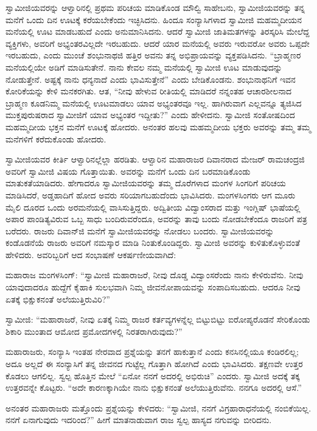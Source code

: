  ಸ್ವಾಮೀಜಿಯವರನ್ನು ಆಳ್ವಾರಿನಲ್ಲಿ ಪ್ರಥಮ ಪರಿಚಯ ಮಾಡಿಕೊಂಡ ಮೌಲ್ವಿ ಸಾಹೇಬನು, ಸ್ವಾಮೀಜಿಯವರನ್ನು ತನ್ನ ಮನೆಗೆ ಒಂದು ದಿನ ಊಟಕ್ಕೆ ಕರೆಯಬೇಕೆಂದು ಇಚ್ಛಿಸಿದನು. ಹಿಂದೂ ಸಂನ್ಯಾಸಿಗಳಾದ ಸ್ವಾಮೀಜಿ ಮಹಮ್ಮದೀಯನ ಮನೆಯಲ್ಲಿ ಊಟ ಮಾಡಬಹುದೆ ಎಂದು ಅನುಮಾನಿಸಿದನು. ಆದರೆ ಸ್ವಾಮೀಜಿ ಜಾತಿಮತಗಳನ್ನು ತಿರಸ್ಕರಿಸಿ ಮೇಲೆದ್ದ ವ್ಯಕ್ತಿಗಳು, ಅವರಿಗೆ ಅಭ್ಯಂತರವಿಲ್ಲದೇ ಇರಬಹುದು. ಆದರೆ ಯಾರ ಮನೆಯಲ್ಲಿ ಅವರು ಇರುವರೋ ಅವರು ಒಪ್ಪದೇ ಇರಬಹುದು, ಎಂದು ಮುಂಚೆ ಶಂಭುನಾಥಜಿ ಹತ್ತಿರ ಅವನು ತನ್ನ ಅಭಿಪ್ರಾಯವನ್ನು ವ್ಯಕ್ತಪಡಿಸಿದನು. “ಬ್ರಾಹ್ಮಣರ ಮನೆಯಲ್ಲಿಯೇ ಅಡಿಗೆ ಮಾಡಿಸುತೇನೆ. ನಾನು ಕೇವಲ ನಮ್ಮ ಮನೆಯಲ್ಲಿ ಸ್ವಾಮೀಜಿ ಊಟ ಮಾಡುವುದನ್ನು ನೋಡುತ್ತೇನೆ. ಅಷ್ಟಕ್ಕೆ ನಾನು ಧನ್ಯನಾದೆ ಎಂದು ಭಾವಿಸುತ್ತೇನೆ” ಎಂದು ಬೇಡಿಕೊಂಡನು. ಶಂಭುನಾಥನಿಗೆ ಇವನ ಕೋರಿಕೆಯನ್ನು ಕೇಳಿ ಮನಕರಗಿತು. ಆತ, “ನೀವು ಹೇಳುವ ರೀತಿಯಲ್ಲಿ ಮಾಡಿದರೆ ನನ್ನಂತಹ ಆಚಾರಶೀಲನಾದ ಬ್ರಾಹ್ಮಣ ಕೂಡನಿಮ್ಮ ಮನೆಯಲ್ಲಿ ಊಟಮಾಡಲು ಯಾವ ಅಭ್ಯಂತರವೂ ಇಲ್ಲ. ಹಾಗಿರುವಾಗ ಎಲ್ಲವನ್ನೂ ತ್ಯಜಿಸಿದ ಮುಕ್ತಪುರುಷರಾದ ಸ್ವಾಮೀಜಿಗೆ ಯಾವ ಅಭ್ಯಂತರ ಇದ್ದೀತು?” ಎಂದು ಹೇಳೀದನು. ಸ್ವಾಮೀಜಿ ಸಂತೋಷದಿಂದ ಮಹಮ್ಮದೀಯ ಭಕ್ತನ ಮನೆಗೆ ಊಟಕ್ಕೆ ಹೋದರು. ಅನಂತರ ಹಲವು ಮಹಮ್ಮದೀಯ ಭಕ್ತರು ಅವರನ್ನು ತಮ್ಮ ತಮ್ಮ ಮನೆಗಳಿಗೆ ಕರೆದುಕೊಂಡು ಹೋದರು. 

 ಸ್ವಾಮೀಜಿಯವರ ಕೀರ್ತಿ ಆಳ್ವಾರಿನಲ್ಲೆಲ್ಲಾ ಹರಡಿತು. ಆಳ್ವಾರಿನ ಮಹಾರಾಜರ ದಿವಾನರಾದ ಮೇಜರ್ ರಾಮಚಂದ್ರಜಿ ಅವರಿಗೆ ಸ್ವಾಮೀಜಿ ವಿಷಯ ಗೊತ್ತಾಯಿತು. ಅವರನ್ನು ಮನೆಗೆ ಒಂದು ದಿನ ಬರಮಾಡಿಕೊಂಡು ಮಾತುಕತೆಯಾಡಿದರು. ಹೇಗಾದರೂ ಸ್ವಾಮೀಜಿಯವರನ್ನು ತಮ್ಮ ದೊರೆಗಳಾದ ಮಂಗಳ ಸಿಂಗರಿಗೆ ಪರಿಚಯ ಮಾಡಿಸಿದರೆ, ಅಡ್ಡಹಾದಿಗೆ ಹೋದ ಅವರು ಸರಿಯಾಗಬಹುದೆಂದು ಭಾವಿಸಿದರು. ಮಂಗಳಸಿಂಗರು ಆಗ ಮೂರು ಮೈಲಿ ದೂರದ ಒಂದು ಅರಮನೆಯಲ್ಲಿ ವಾಸಿಸುತ್ತಿದ್ದರು. ಅದ್ವಿತೀಯ ವಿದ್ವಾಂಸರಾದ ಮತ್ತು ಇಂಗ್ಲಿಷ್ ಭಾಷೆಯಲ್ಲಿ ಅಪಾರ ಪಾಂಡಿತ್ಯವಿರುವ ಒಬ್ಬ ಸಾಧು ಬಂದಿರುವರೆಂದೂ, ಅವರನ್ನು ತಾವು ಬಂದು ನೋಡಬೇಕೆಂದೂ ರಾಜರಿಗೆ ಪತ್ರ ಬರೆದರು. ರಾಜರು ದಿವಾನ್‍ಜಿ ಮನೆಗೆ ಸ್ವಾಮೀಜಿಯವರನ್ನು ನೋಡಲು ಬಂದರು. ಸ್ವಾಮೀಜಿಯವರನ್ನು ಕಂಡೊಡನೆಯೆ ರಾಜರು ಅವರಿಗೆ ನಮಸ್ಕಾರ ಮಾಡಿ ನಿಂತುಕೊಂಡಿದ್ದರು. ಸ್ವಾಮೀಜಿ ಅವರನ್ನು ಕುಳಿತುಕೊಳ್ಳುವಂತೆ ಹೇಳಿದರು. ಅವರಿಬ್ಬರಿಗೆ ಆದ ಸಂಭಾಷಣೆ ಆಕರ್ಷಣೀಯವಾಗಿದೆ: 

 ಮಹಾರಾಜ ಮಂಗಳಸಿಂಗ್: “ಸ್ವಾಮೀಜಿ ಮಹಾರಾಜರೆ, ನೀವು ದೊಡ್ಡ ವಿದ್ವಾಂಸರೆಂದು ನಾನು ಕೇಳಿರುವೆನು. ನೀವು ಯಾವುದಾದರೂ ಹುದ್ದೆಗೆ ಕೈಹಾಕಿ ಸುಲಭವಾಗಿ ನಿಮ್ಮ ಜೀವನೋಪಾಯವನ್ನು ಸಂಪಾದಿಸಬಹುದು. ಆದರೂ ನೀವು ಏತಕ್ಕೆ ಭಿಕ್ಷುಕನಂತೆ ಅಲೆಯುತ್ತಿರುವಿರಿ?” 

 ಸ್ವಾಮೀಜಿ: “ಮಹಾರಾಜರೆ, ನೀವು ಏತಕ್ಕೆ ನಿಮ್ಮ ರಾಜರ ಕರ್ತವ್ಯಗಳನ್ನೆಲ್ಲ ಬಿಟ್ಟುಬಿಟ್ಟು ಐರೋಪ್ಯರೊಡನೆ ಸೇರಿಕೊಂಡು ಶಿಕಾರಿ ಮುಂತಾದ ಆಮೋದ ಪ್ರಮೋದಗಳಲ್ಲಿ ನಿರತರಾಗಿರುವುದು?” 

 ಮಹಾರಾಜರು, ಸಂನ್ಯಾಸಿ ಇಂತಹ ನೇರವಾದ ಪ್ರಶ್ನೆಯನ್ನು ತನಗೆ ಹಾಕುತ್ತಾನೆ ಎಂದು ಕನಸಿನಲ್ಲಿಯೂ ಕಂಡಿರಲಿಲ್ಲ; ಅದೂ ಅಲ್ಲದೆ ಈ ಸಂನ್ಯಾಸಿಗೆ ತನ್ನ ಜೀವನದ ಗುಟ್ಟೆಲ್ಲ ಗೊತ್ತಾಗಿ ಹೋಗಿದೆ ಎಂದು ಭಾವಿಸಿದರು. ತಕ್ಷಣವೇ ಉತ್ತರ ಕೊಡಲು ಆಗಲಿಲ್ಲ. ಸ್ವಲ್ಪ ಹೊತ್ತಿನ ಮೇಲೆ “ಏನೋ ನನಗೆ ಅದರಲ್ಲಿ ಅಭಿರುಚಿ” ಎಂದರು. ಸ್ವಾಮೀಜಿ ಅದಕ್ಕೆ ತಕ್ಕ ಉತ್ತರವನ್ನೇ ಕೊಟ್ಟರು. “ಅದೇ ಕಾರಣಕ್ಕಾಗಿಯೇ ನಾನು ಭಿಕ್ಷುಕನಂತೆ ಅಲೆಯುತ್ತಿರುವೆನು. ನನಗೂ ಅದರಲ್ಲಿ ಆಸೆ.” 

 ಅನಂತರ ಮಹಾರಾಜರು ಮತ್ತೊಂದು ಪ್ರಶ್ನೆಯನ್ನು ಕೇಳಿದರು: “ಸ್ವಾಮೀಜಿ, ನನಗೆ ವಿಗ್ರಹಾರಾಧನೆಯಲ್ಲಿ ನಂಬಿಕೆಯಿಲ್ಲ. ನನಗೆ ಏನಾಗುವುದು ಇದರಿಂದ?” ಹೀಗೆ ಮಾತನಾಡುವಾಗ ರಾಜ ಸ್ವಲ್ಪ ಹಾಸ್ಯದ ನಗುವನ್ನು ಬೀರಿದನು. 

